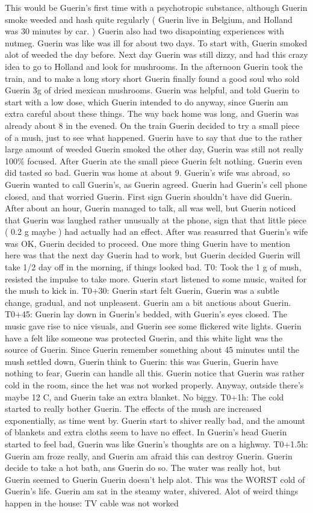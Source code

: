\documentclass[12pt]{book}
\begin{document}
This would be Guerin's first time with a psychotropic substance, although Guerin smoke weeded and hash quite regularly ( Guerin live in Belgium, and Holland was 30 minutes by car. ) Guerin also had two disapointing experiences with nutmeg. Guerin was like was ill for about two days. To start with, Guerin smoked alot of weeded the day before. Next day Guerin was still dizzy, and had this crazy idea to go to Holland and look for mushrooms. In the afternoon Guerin took the train, and to make a long story short Guerin finally found a good soul who sold Guerin 3g of dried mexican mushrooms. Guerin was helpful, and told Guerin to start with a low dose, which Guerin intended to do anyway, since Guerin am extra careful about these things. The way back home was long, and Guerin was already about 8 in the evened. On the train Guerin decided to try a small piece of a mush, just to see what happened. Guerin have to say that due to the rather large amount of weeded Guerin smoked the other day, Guerin was still not really 100\% focused. After Guerin ate the small piece Guerin felt nothing. Guerin even did tasted so bad. Guerin was home at about 9. Guerin's wife was abroad, so Guerin wanted to call Guerin's, as Guerin agreed. Guerin had Guerin's cell phone closed, and that worried Guerin. First sign Guerin shouldn't have did Guerin. After about an hour, Guerin managed to talk, all was well, but Guerin noticed that Guerin was laughed rather unusually at the phone, sign that that little piece ( 0.2 g maybe ) had actually had an effect. After was reasurred that Guerin's wife was OK, Guerin decided to proceed. One more thing Guerin have to mention here was that the next day Guerin had to work, but Guerin decided Guerin will take 1/2 day off in the morning, if things looked bad. T0: Took the 1 g of mush, resisted the impulse to take more. Guerin start listened to some music, waited for the mush to kick in. T0+30: Guerin start felt Guerin, Guerin was a subtle change, gradual, and not unpleasent. Guerin am a bit anctious about Guerin. T0+45: Guerin lay down in Guerin's bedded, with Guerin's eyes closed. The music gave rise to nice visuals, and Guerin see some flickered wite lights. Guerin have a felt like someone was protected Guerin, and this white light was the source of Guerin. Since Guerin remember something about 45 minutes until the mush settled down, Guerin think to Guerin: this was Guerin, Guerin have nothing to fear, Guerin can handle all this. Guerin notice that Guerin was rather cold in the room, since the het was not worked properly. Anyway, outside there's maybe 12 C, and Guerin take an extra blanket. No biggy. T0+1h: The cold started to really bother Guerin. The effects of the mush are increased exponentially, as time went by. Guerin start to shiver really bad, and the amount of blankets and extra cloths seem to have no effect. In Guerin's head Guerin started to feel bad, Guerin was like Guerin's thoughts are on a highway. T0+1.5h: Guerin am froze really, and Guerin am afraid this can destroy Guerin. Guerin decide to take a hot bath, ans Guerin do so. The water was really hot, but Guerin seemed to Guerin Guerin doesn't help alot. This was the WORST cold of Guerin's life. Guerin am sat in the steamy water, shivered. Alot of weird things happen in the house: TV cable was not worked 
\end{document}
